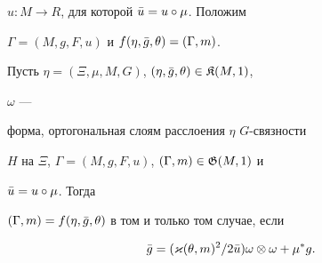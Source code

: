 $u:M\to R$, для которой $\Bar u=u\circ\mu$. Положим 


$\Gamma=(M,g,F,u)$ и $f(\eta,\Bar g,\theta)=(\Gamma,m)$. 


 


\begin{lem} 


Пусть $\eta=(\Xi,\mu,M,G)$, $(\eta,\Bar g,\theta)\in\frak K(M,1)$, 


$\omega$ --- 


форма, ортогональная слоям расслоения $\eta$ $G$-связности 


$H$ на $\Xi$, $\Gamma=(M,g,F,u)$, $(\Gamma,m)\in\frak G(M,1)$ и 


$\Bar u=u\circ\mu$. Тогда 


$(\Gamma,m)=f(\eta,\Bar g,\theta)$ в том и только том случае, если 


\begin{equation} 


\Bar g=(\varkappa(\theta,m)^2/2\Bar u)\omega\otimes\omega+\mu^*g. 


\end{equation} 


\end{lem} 


 


